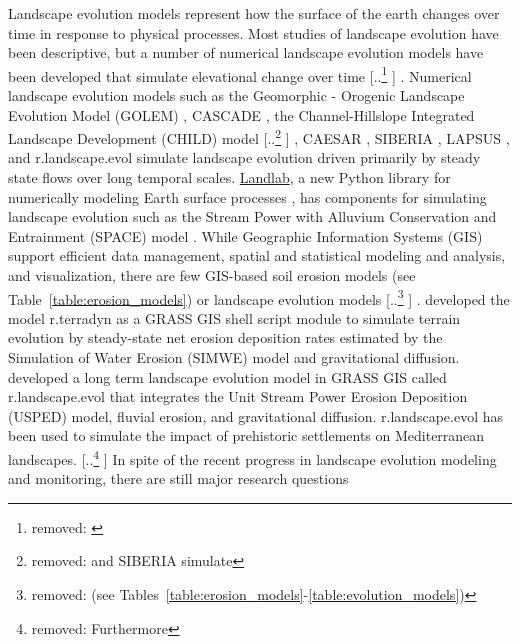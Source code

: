 \documentclass[gmd, manuscript]{copernicus}
\providecommand{\DIFadd}[1]{{\protect\color{blue} \sf #1}} %
\providecommand{\DIFdel}[1]{{\protect\color{red} [..\footnote{removed: #1} ]}} %
\providecommand{\DIFaddbegin}{} %
\providecommand{\DIFaddend}{} %
\providecommand{\DIFdelbegin}{} %
\providecommand{\DIFdelend}{} %
\begin{document}
\introduction
Landscape evolution models represent how the surface of the earth changes 
over time in response to physical processes. 
Most studies of landscape evolution have been descriptive, 
but a number of numerical landscape evolution models 
have been developed that simulate elevational change over time 
\DIFdelbegin \DIFdel{\citep{Temme2013}}\DIFdelend \DIFaddbegin \DIFadd{\citep{Tucker2010,Temme2013}}\DIFaddend . 
Numerical landscape evolution models such as the 
\DIFaddbegin \DIFadd{Geomorphic - Orogenic Landscape Evolution Model (GOLEM) 
\citep{Tucker1994},
CASCADE \citep{Braun1997},
the }\DIFaddend Channel-Hillslope Integrated Landscape Development (CHILD) model 
\citep{Tucker2001}\DIFdelbegin \DIFdel{and SIBERIA \citep{Willgoose2005}simulate }\DIFdelend \DIFaddbegin \DIFadd{,
CAESAR \citep{Coulthard2002,Coulthard2012},
SIBERIA \citep{Willgoose2005},
LAPSUS \citep{Schoorl2000,Schoorl2002},
and r.landscape.evol \citep{Barton2010}
simulate landscape evolution driven primarily by }\DIFaddend steady state flows over long temporal scales.
\href{http://landlab.github.io/}{Landlab},
a new Python library for numerically modeling Earth surface processes
\citep{Hobley2017},
has components for simulating landscape evolution such as the 
Stream Power with Alluvium Conservation and Entrainment (SPACE) 
model \citep{Shobe2017}.
While Geographic Information Systems (GIS)
support efficient data management, 
spatial and statistical modeling and analysis, 
and visualization,
there are few GIS-based soil erosion models \DIFaddbegin \DIFadd{(see Table~\ref{table:erosion_models})
}\DIFaddend or landscape evolution models\DIFdelbegin \DIFdel{(see Tables~\ref{table:erosion_models}-\ref{table:evolution_models}) }\DIFdelend \DIFaddbegin \DIFadd{.
\cite{Thaxton2004} developed the model r.terradyn as a GRASS GIS shell script module 
to simulate terrain evolution by steady-state net erosion deposition rates
estimated by the Simulation of Water Erosion (SIMWE) model \citep{Mitas1998}
and gravitational diffusion. 
\cite{Barton2010} developed a long term landscape evolution model
in GRASS GIS called r.landscape.evol that integrates 
the Unit Stream Power Erosion Deposition (USPED) model,
fluvial erosion, and gravitational diffusion.
r.landscape.evol has been used to simulate the impact 
of prehistoric settlements on Mediterranean landscapes}\DIFaddend .
\DIFdelbegin \DIFdel{Furthermore }\DIFdelend \DIFaddbegin \DIFadd{In spite of the recent progress in landscape evolution modeling and monitoring, 
}\DIFaddend there are still major research questions 
\end{document}
